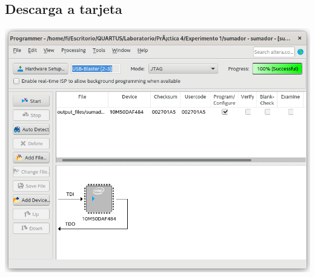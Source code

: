\documentclass[10pt,a4paper]{article}
\begin{document}
	\subsection{Descarga a tarjeta}
	\begin{center}
		\includegraphics[scale=0.35]{Descarga.png}
	\end{center}
	
\end{document}
